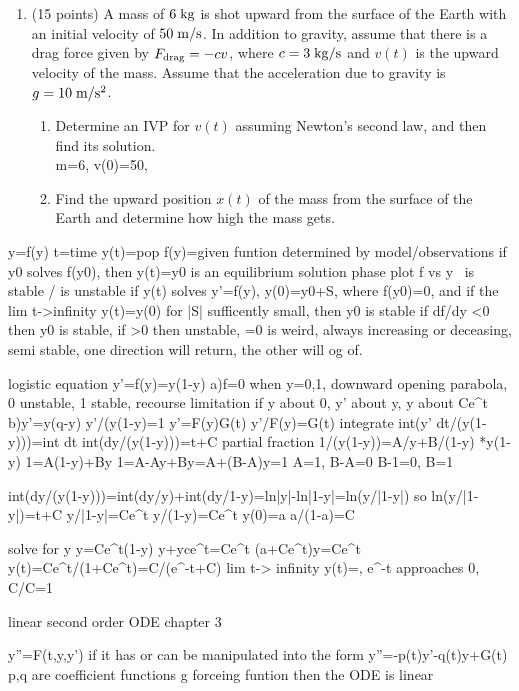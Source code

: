 \documentclass{article}
\begin{document}
\begin{enumerate}
\bigskip
\item (15 points)  A mass of $6\;{\rm kg}$ is shot upward from the surface of the Earth with an initial velocity of $50\;{\rm m}/{\rm s}$.  In addition to gravity, assume that there is a drag force given by $F_{{\rm drag}}=-cv$, where $c=3\;{\rm kg}/{\rm s}$ and $v(t)$ is the upward velocity of the mass.  Assume that the acceleration due to gravity is $g=10\;{\rm m}/{\rm s}^2$.
\begin{enumerate}
\item Determine an IVP for $v(t)$ assuming Newton's second law, and then find its solution.
\\m=6, v(0)=50, 
\item Find the upward position $x(t)$ of the mass from the surface of the Earth and determine how high the mass gets.
\end{enumerate}



\end{enumerate}

\iffalse
y=f(y)
t=time
y(t)=pop
f(y)=given funtion determined by model/observations
if y0 solves f(y0), then y(t)=y0 is an equilibrium solution
phase plot f vs y
\ is stable / is unstable
if y(t) solves y'=f(y), y(0)=y0+S, where f(y0)=0, and if the lim t->infinity y(t)=y(0) for |S| sufficently small, then y0 is stable
if df/dy <0 then y0 is stable, if >0 then unstable, =0 is weird, always increasing or deceasing, semi stable, one direction will return, the other will og of.

logistic equation
y'=f(y)=y(1-y)
a)f=0 when y=0,1, downward opening parabola, 0 unstable, 1 stable, recourse limitation
if y about 0, y' about y, y about Ce^t
b)y'=y(q-y)
y'/(y(1-y)=1
y'=F(y)G(t)
y'/F(y)=G(t)
integrate
int(y' dt/(y(1-y)))=int dt
int(dy/(y(1-y)))=t+C
partial fraction
1/(y(1-y))=A/y+B/(1-y)
*y(1-y)
1=A(1-y)+By
1=A-Ay+By=A+(B-A)y=1
A=1, B-A=0
B-1=0, B=1

int(dy/(y(1-y)))=int(dy/y)+int(dy/1-y)=ln|y|-ln|1-y|=ln(y/|1-y|)
so ln(y/|1-y|)=t+C
y/|1-y|=Ce^t
y/(1-y)=Ce^t
y(0)=a
a/(1-a)=C

solve for y
y=Ce^t(1-y)
y+yce^t=Ce^t
(a+Ce^t)y=Ce^t
y(t)=Ce^t/(1+Ce^t)=C/(e^-t+C)
lim t-> infinity y(t)=, e^-t approaches 0, C/C=1



linear second order ODE chapter 3

y''=F(t,y,y')
if it has or can be manipulated into the form y''=-p(t)y'-q(t)y+G(t) 
p,q are coefficient functions
g forceing funtion
then the ODE is linear
\end{document}
